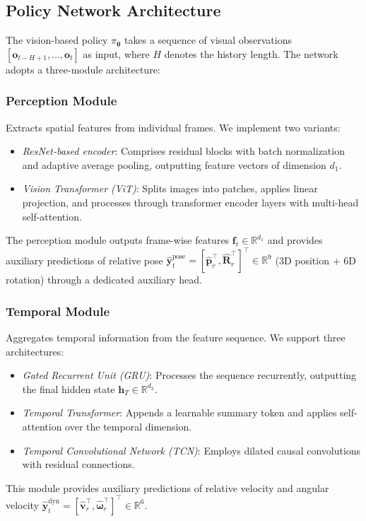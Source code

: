 \subsection{Policy Network Architecture}
\label{sec:architecture}

The vision-based policy $\pi_{\boldsymbol{\theta}}$ takes a sequence of visual observations $[\mathbf{o}_{t-H+1}, \ldots, \mathbf{o}_t]$ as input, where $H$ denotes the history length. The network adopts a three-module architecture:

\subsubsection{Perception Module}

Extracts spatial features from individual frames. We implement two variants:
\begin{itemize}
    \item \textit{ResNet-based encoder}: Comprises residual blocks with batch normalization and adaptive average pooling, outputting feature vectors of dimension $d_1$.
    \item \textit{Vision Transformer (ViT)}: Splits images into patches, applies linear projection, and processes through transformer encoder layers with multi-head self-attention.
\end{itemize}
The perception module outputs frame-wise features $\mathbf{f}_t \in \mathbb{R}^{d_1}$ and provides auxiliary predictions of relative pose $\hat{\mathbf{y}}_t^{\text{pose}} = [\hat{\mathbf{p}}_r^\top, \hat{\mathbf{R}}_r^\top]^\top \in \mathbb{R}^9$ (3D position + 6D rotation) through a dedicated auxiliary head.

\subsubsection{Temporal Module}

Aggregates temporal information from the feature sequence. We support three architectures:
\begin{itemize}
    \item \textit{Gated Recurrent Unit (GRU)}: Processes the sequence recurrently, outputting the final hidden state $\mathbf{h}_T \in \mathbb{R}^{d_2}$.
    \item \textit{Temporal Transformer}: Appends a learnable summary token and applies self-attention over the temporal dimension.
    \item \textit{Temporal Convolutional Network (TCN)}: Employs dilated causal convolutions with residual connections.
\end{itemize}
This module provides auxiliary predictions of relative velocity and angular velocity $\hat{\mathbf{y}}_t^{\text{dyn}} = [\hat{\mathbf{v}}_r^\top, \hat{\boldsymbol{\omega}}_r^\top]^\top \in \mathbb{R}^6$.

